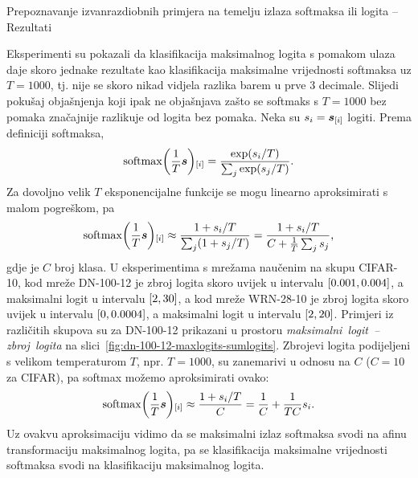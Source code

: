 \documentclass{beamer}
\begin{document}
\begin{frame}[allowframebreaks=0.9]{Prepoznavanje izvanrazdiobnih primjera na temelju izlaza softmaksa ili logita -- Rezultati}
\begin{table}
	\caption{Razlikovanje izvanrazdiobnih i unutarrazdiobnih primjera kod mreža naučenih na skupu CIFAR-10. Za svaku evaluacijsku mjeru $5$ stupaca redom predstavlja klasifikaciju po maksimalnoj vrijednosti:	(1) softmaksa uz $T=1$, (2) softmaksa uz $T=1000$, (3) softmaksa uz $T=1000$ i pomak ulaza FGSM-om, (4) logita i (5) logita uz pomak ulaza FGSM-om. Podebljani su najbolji rezultati (više njih ako se razlikuju od najboljeg za manje od $0.003$) za svaki par izvanrazdiobnog skupa i evaluacijske mjere.}
\end{table}

Eksperimenti su pokazali da klasifikacija maksimalnog logita s pomakom ulaza daje skoro jednake rezultate kao klasifikacija maksimalne vrijednosti softmaksa uz $T=1000$, tj. nije se skoro nikad vidjela razlika barem u prve $3$ decimale. Slijedi pokušaj objašnjenja koji ipak ne objašnjava zašto se softmaks s $T=1000$ bez pomaka značajnije razlikuje od logita bez pomaka.
Neka su $s_i=\vec s_\ind{i}$ logiti. Prema definiciji softmaksa,
\begin{align}
\softmax\del{\frac{1}{T}\vec s}_\ind{i} = \frac{\exp(s_i/T)}{\sum_j \exp(s_j/T)} \text{.}
\end{align}
Za dovoljno velik $T$ eksponencijalne funkcije se mogu linearno aproksimirati s malom pogreškom, pa 
\begin{align}
\softmax\del{\frac{1}{T}\vec s}_\ind{i}
\approx \frac{1+s_i/T}{\sum_j (1+s_j/T)}
= \frac{1+s_i/T}{C + \frac{1}{T}\sum_j s_j}
\text{,}
\end{align}
gdje je $C$ broj klasa. U eksperimentima s mrežama naučenim na skupu CIFAR-10, kod mreže DN-100-12 je zbroj logita skoro uvijek u intervalu $\intcc{0.001,0.004}$, a maksimalni logit u intervalu $\intcc{2,30}$, a kod mreže WRN-28-10 je zbroj logita skoro uvijek u intervalu $\intcc{0,0.0004}$, a maksimalni logit u intervalu $\intcc{2,20}$. Primjeri iz različitih skupova su za DN-100-12 prikazani u prostoru \textit{maksimalni~logit~-- zbroj~logita} na slici~\ref{fig:dn-100-12-maxlogits-sumlogits}. Zbrojevi logita podijeljeni s velikom temperaturom $T$, npr. $T=1000$, su zanemarivi u odnosu na $C$ ($C=10$ za CIFAR), pa softmax možemo aproksimirati ovako:
\begin{align}
\softmax\del{\frac{1}{T}\vec s}_\ind{i}
\approx \frac{1+s_i/T}{C}
= \frac{1}{C}+\frac{1}{TC}s_i
\text{.}
\end{align}
Uz ovakvu aproksimaciju vidimo da se maksimalni izlaz softmaksa svodi na afinu transformaciju maksimalnog logita, pa se klasifikacija maksimalne vrijednosti softmaksa svodi na klasifikaciju maksimalnog logita.


\end{frame}
\end{document}
